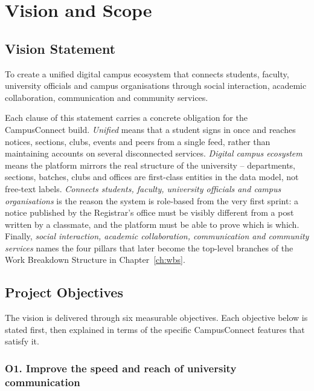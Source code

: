 \documentclass[11pt,a4paper]{report}
\begin{document}
\chapter{Vision and Scope}
\label{ch:vision}

\section{Vision Statement}

\begin{keybox}
To create a unified digital campus ecosystem that connects students, faculty,
university officials and campus organisations through social interaction,
academic collaboration, communication and community services.
\end{keybox}

Each clause of this statement carries a concrete obligation for the CampusConnect
build. \emph{Unified} means that a student signs in once and reaches notices,
sections, clubs, events and peers from a single feed, rather than maintaining
accounts on several disconnected services. \emph{Digital campus ecosystem} means
the platform mirrors the real structure of the university -- departments,
sections, batches, clubs and offices are first-class entities in the data model,
not free-text labels. \emph{Connects students, faculty, university officials and
campus organisations} is the reason the system is role-based from the very first
sprint: a notice published by the Registrar's office must be visibly different
from a post written by a classmate, and the platform must be able to prove which
is which. Finally, \emph{social interaction, academic collaboration,
communication and community services} names the four pillars that later become
the top-level branches of the Work Breakdown Structure in Chapter~\ref{ch:wbs}.

\section{Project Objectives}

The vision is delivered through six measurable objectives. Each objective below
is stated first, then explained in terms of the specific CampusConnect features
that satisfy it.

\subsection*{O1. Improve the speed and reach of university communication}
\end{document}
